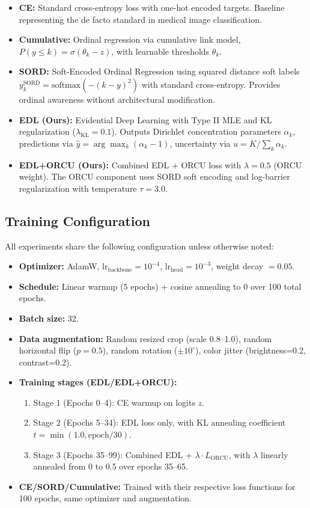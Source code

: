 \begin{itemize}
    \item \textbf{CE:} Standard cross-entropy loss with one-hot encoded targets. Baseline representing the de facto standard in medical image classification.
    \item \textbf{Cumulative:} Ordinal regression via cumulative link model, $P(y \leq k) = \sigma(\theta_k - z)$, with learnable thresholds $\theta_k$.
    \item \textbf{SORD:} Soft-Encoded Ordinal Regression using squared distance soft labels $y^{\text{SORD}}_k = \text{softmax}(-(k - y)^2)$ with standard cross-entropy. Provides ordinal awareness without architectural modification.
    \item \textbf{EDL (Ours):} Evidential Deep Learning with Type II MLE and KL regularization ($\lambda_{\text{KL}} = 0.1$). Outputs Dirichlet concentration parameters $\alpha_k$, predictions via $\hat{y} = \arg\max_k(\alpha_k - 1)$, uncertainty via $u = K / \sum_k \alpha_k$.
    \item \textbf{EDL+ORCU (Ours):} Combined EDL + ORCU loss with $\lambda = 0.5$ (ORCU weight). The ORCU component uses SORD soft encoding and log-barrier regularization with temperature $\tau = 3.0$.
\end{itemize}

\subsection{Training Configuration}

All experiments share the following configuration unless otherwise noted:

\begin{itemize}
    \item \textbf{Optimizer:} AdamW, $\text{lr}_{\text{backbone}} = 10^{-4}$, $\text{lr}_{\text{head}} = 10^{-3}$, weight decay $= 0.05$.
    \item \textbf{Schedule:} Linear warmup (5 epochs) + cosine annealing to 0 over 100 total epochs.
    \item \textbf{Batch size:} 32.
    \item \textbf{Data augmentation:} Random resized crop (scale 0.8--1.0), random horizontal flip ($p=0.5$), random rotation ($\pm 10^\circ$), color jitter (brightness=0.2, contrast=0.2).
    \item \textbf{Training stages (EDL/EDL+ORCU):}
    \begin{enumerate}
        \item Stage 1 (Epochs 0--4): CE warmup on logits $z$.
        \item Stage 2 (Epochs 5--34): EDL loss only, with KL annealing coefficient $t = \min(1.0, \text{epoch} / 30)$.
        \item Stage 3 (Epochs 35--99): Combined EDL + $\lambda \cdot L_{\text{ORCU}}$, with $\lambda$ linearly annealed from 0 to 0.5 over epochs 35--65.
    \end{enumerate}
    \item \textbf{CE/SORD/Cumulative:} Trained with their respective loss functions for 100 epochs, same optimizer and augmentation.
\end{itemize}

